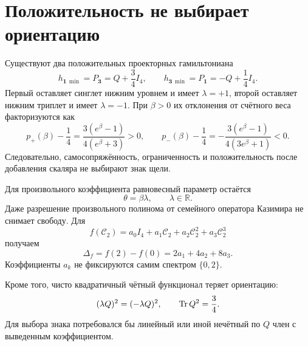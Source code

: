 \section{Положительность не выбирает ориентацию}

Существуют два положительных проекторных гамильтониана
\begin{equation}
 h_{\mathbf1\,\min}=P_{\mathbf3}=Q+\frac34I_4,
 \qquad
 h_{\mathbf3\,\min}=P_{\mathbf1}=-Q+\frac14I_4.
 \label{eq:v8-baryon-c0-central-gap-positive-orientation-witnesses}
\end{equation}
Первый оставляет синглет нижним уровнем и имеет $\lambda=+1$, второй
оставляет нижним триплет и имеет $\lambda=-1$. При $\beta>0$ их отклонения
от счётного веса факторизуются как
\begin{equation}
 p_+(\beta)-\frac14
 =\frac{3(e^\beta-1)}{4(e^\beta+3)}>0,
 \qquad
 p_-(\beta)-\frac14
 =-\frac{3(e^\beta-1)}{4(3e^\beta+1)}<0.
 \label{eq:v8-baryon-c0-central-gap-opposite-weight-witnesses}
\end{equation}
Следовательно, самосопряжённость, ограниченность и положительность после
добавления скаляра не выбирают знак щели.

Для произвольного коэффициента равновесный параметр остаётся
\begin{equation}
 \theta=\beta\lambda,
 \qquad \lambda\in\mathbb R.
 \label{eq:v8-baryon-c0-central-gap-free-coefficient}
\end{equation}
Даже разрешение произвольного полинома от семейного оператора Казимира не
снимает свободу. Для
\begin{equation}
 f(\mathcal C_2)=a_0I_4+a_1\mathcal C_2
 +a_2\mathcal C_2^2+a_3\mathcal C_2^3
 \label{eq:v8-baryon-c0-central-gap-casimir-polynomial}
\end{equation}
получаем
\begin{equation}
 \Delta_f=f(2)-f(0)=2a_1+4a_2+8a_3.
 \label{eq:v8-baryon-c0-central-gap-polynomial-coefficient}
\end{equation}
Коэффициенты $a_k$ не фиксируются самим спектром $\{0,2\}$.

Кроме того, чисто квадратичный чётный функционал теряет ориентацию:
\begin{equation}
 (\lambda Q)^2=(-\lambda Q)^2,
 \qquad \operatorname{Tr} Q^2=\frac34.
 \label{eq:v8-baryon-c0-central-gap-quadratic-sign-blindness}
\end{equation}
Для выбора знака потребовался бы линейный или иной нечётный по $Q$ член с
выведенным коэффициентом.

